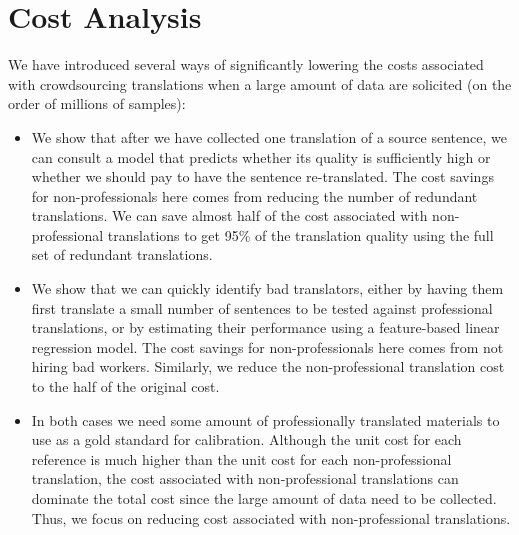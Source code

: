 \documentclass[11pt,letterpaper]{article}
\begin{document}
\section{Cost Analysis}

 We have introduced several ways of significantly lowering the costs associated with crowdsourcing translations when a large amount of data are solicited (on the order of millions of samples):
\begin{itemize}
\setlength\itemsep{0em}
\item We show that after we have collected one translation of a source sentence, we can consult a model that predicts whether its quality is sufficiently high or whether we should pay to have the sentence re-translated.  The cost savings for non-professionals here comes from reducing the number of redundant translations. We can save almost half of the cost associated with non-professional translations to get 95\% of the translation quality using the full set of redundant translations.
\item We show that we can quickly identify bad translators, either by having them first translate a small number of sentences to be tested against professional translations, or by estimating their performance using a feature-based linear regression model. The cost savings for non-professionals here comes from not hiring bad workers. Similarly, we reduce the non-professional translation cost to the half of the original cost.

\item In both cases we need some amount of professionally translated materials  to use as a gold standard for calibration. Although the unit cost for each reference is much higher than the unit cost for each non-professional translation, the cost associated with non-professional translations can dominate the total cost since the large amount of data need to be collected. Thus, we focus on reducing cost associated with non-professional translations. 
\end{itemize}
%
\end{document}
